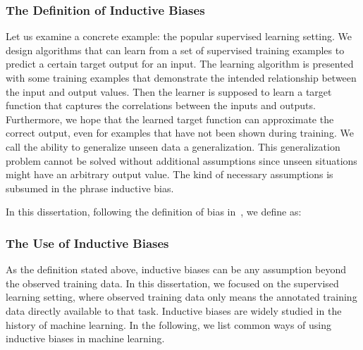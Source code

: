 \subsubsection{The Definition of Inductive Biases}
\label{sssec:intro:def-bias}
Let us examine a concrete example: the popular supervised learning
setting. We design algorithms that can learn from a set of supervised
training examples to predict a certain target output for an input. The
learning algorithm is presented with some training examples that
demonstrate the intended relationship between the input and output
values. Then the learner is supposed to learn a target function that
captures the correlations between the inputs and outputs. Furthermore,
we hope that the learned target function can approximate the correct
output, even for examples that have not been shown during training. We
call the ability to generalize unseen data a generalization. This
generalization problem cannot be solved without additional assumptions
since unseen situations might have an arbitrary output value. The kind
of necessary assumptions is subsumed in the phrase inductive bias.


In this dissertation, following the definition of bias
in~\cite{mitchell1980need}, we define  as:


\subsubsection{The Use of Inductive Biases}
\label{sssec:intro:use-bias}
As the definition stated above, inductive biases can be any assumption
beyond the observed training data. In this dissertation, we focused on the
supervised learning setting, where observed training data only means
the annotated training data directly available to that task. Inductive
biases are widely studied in the history of machine learning. In the
following, we list common ways of using inductive biases in
machine learning.

